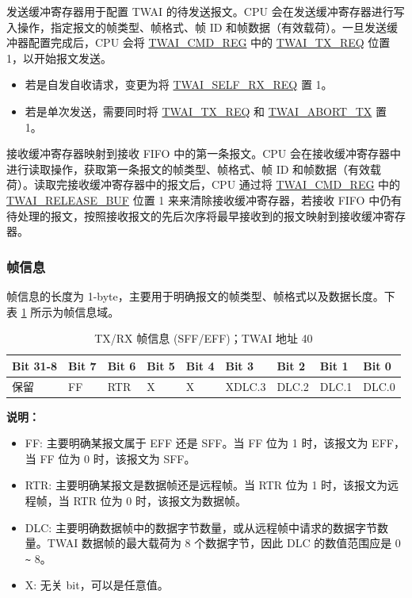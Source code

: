\documentclass[main\_\_CN.tex]{subfiles}
\begin{document}
发送缓冲寄存器用于配置 TWAI 的待发送报文。CPU 会在发送缓冲寄存器进行写入操作，指定报文的帧类型、帧格式、帧 ID 和帧数据（有效载荷）。一旦发送缓冲器配置完成后，CPU 会将 \hyperref[regdesc:TWAICMDREG]{TWAI\_CMD\_REG} 中的 \hyperref[fielddesc:TWAITXREQ]{TWAI\_TX\_REQ} 位置 1，以开始报文发送。

\begin{itemize}
    \item 若是自发自收请求，变更为将 \hyperref[fielddesc:TWAISELFRXREQ]{TWAI\_SELF\_RX\_REQ} 置 1。
    \item 若是单次发送，需要同时将 \hyperref[fielddesc:TWAITXREQ]{TWAI\_TX\_REQ} 和 \hyperref[fielddesc:TWAIABORTTX]{TWAI\_ABORT\_TX} 置 1。
\end{itemize}

接收缓冲寄存器映射到接收 FIFO 中的第一条报文。CPU 会在接收缓冲寄存器中进行读取操作，获取第一条报文的帧类型、帧格式、帧 ID 和帧数据（有效载荷）。读取完接收缓冲寄存器中的报文后，CPU 通过将 \hyperref[regdesc:TWAICMDREG]{TWAI\_CMD\_REG} 中的 \hyperref[fielddesc:TWAIRELEASEBUF]{TWAI\_RELEASE\_BUF} 位置 1 来来清除接收缓冲寄存器，若接收 FIFO 中仍有待处理的报文，按照接收报文的先后次序将最早接收到的报文映射到接收缓冲寄存器。

\subsubsection{帧信息}
帧信息的长度为 1-byte，主要用于明确报文的帧类型、帧格式以及数据长度。下表 \ref{table:frame_info} 所示为帧信息域。

\begin{longtable}[c]{|p{1.4cm}|p{1.4cm}|p{1.4cm}|p{1.4cm}|p{1.4cm}|p{1.4cm}|p{1.4cm}|p{1.4cm}|p{1.4cm}|}
    \caption{TX/RX 帧信息 (SFF/EFF)；TWAI 地址 \hexprefix{}40}
    \label{table:frame_info}\\
    \hline
       \rowcolor{lightgray}
    Bit 31-8 & Bit 7 & Bit 6 & Bit 5 & Bit 4 & Bit 3 & Bit 2 & Bit 1 & Bit 0\\
    \hline
    保留 & FF & RTR  & X  & X  & XDLC.3 & DLC.2 & DLC.1 & DLC.0\\
    \hline
\end{longtable}
\vspace{-1.5em}
{\bfseries 说明：}\\
\begin{itemize}
    \item FF: 主要明确某报文属于 EFF 还是 SFF。当 FF 位为 1 时，该报文为 EFF，当 FF 位为 0 时，该报文为 SFF。
    \item RTR: 主要明确某报文是数据帧还是远程帧。当 RTR 位为 1 时，该报文为远程帧，当 RTR 位为 0 时，该报文为数据帧。
    \item DLC: 主要明确数据帧中的数据字节数量，或从远程帧中请求的数据字节数量。TWAI 数据帧的最大载荷为 8 个数据字节，因此 DLC 的数值范围应是 0 \verb+~+ 8。
    \item X: 无关 bit，可以是任意值。
\end{itemize}
\end{document}
